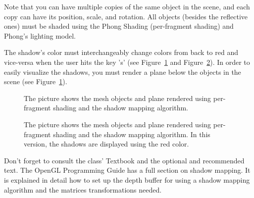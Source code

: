 \documentclass[11pt]{article}
\begin{document}
Note that you can have multiple copies of the same object in the scene, and each copy can have its position, scale, and rotation. All objects (besides the reflective ones) must be shaded using the Phong Shading (per-fragment shading) and Phong's lighting model.

The shadow's color must interchangeably change colors from back to red and vice-versa when the user hits the key 's' (see Figure~\ref{fig:shadow-black} and Figure~\ref{fig:shadow-red}).
In order to easily visualize the shadows, you must render a plane below the objects in the scene (see Figure~\ref{fig:shadow-black}).

\begin{figure}[tbh]
  \centering
  \caption{The picture shows the mesh objects and plane rendered using per-fragment shading and the shadow mapping algorithm.}
  \label{fig:shadow-black}
\end{figure}

\begin{figure}[tbh]
  \centering
  \caption{The picture shows the mesh objects and plane rendered using per-fragment shading and the shadow mapping algorithm. In this version, the shadows are displayed using the red color.}
  \label{fig:shadow-red}
\end{figure}


Don't forget to consult the class' Textbook and the optional and recommended text. The OpenGL Programming Guide has a full section on shadow mapping. It is explained in detail how to set up the depth buffer for using a shadow mapping algorithm and the matrices transformations needed.
\end{document}
